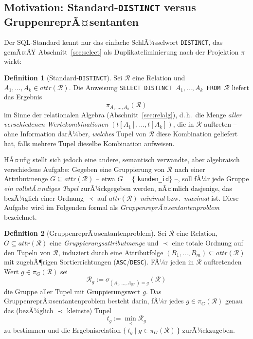 ﻿\documentclass[a4paper,12pt]{report}
\theoremstyle{definition}
\newtheorem{definition}{Definition}[chapter]
\theoremstyle{remark}
\newcommand{\R}{\mathcal{R}}
\newcommand{\att}{\mathit{attr}}
\begin{document}
\subsection{Motivation: Standard-\texttt{DISTINCT} versus GruppenreprÃ¤sentanten}

Der SQL-Standard kennt nur das einfache SchlÃ¼sselwort
\texttt{DISTINCT}, das gemÃ¤ÃŸ Abschnitt~\ref{sec:select} als
Duplikateliminierung nach der Projektion $\pi$ wirkt:

\begin{definition}[Standard-\texttt{DISTINCT}]
\label{def:distinct-standard}
Sei $\R$ eine Relation und $A_1,\ldots,A_k\in\att(\R)$. Die Anweisung
\texttt{SELECT DISTINCT $A_1,\ldots,A_k$ FROM $\R$} liefert das
Ergebnis
\[
  \pi_{A_1,\ldots,A_k}(\R)
\]
im Sinne der relationalen Algebra (Abschnitt~\ref{sec:relalg}), d.\,h.\
die Menge \emph{aller verschiedenen Wertekombinationen}
$(t[A_1],\ldots,t[A_k])$, die in $\R$ auftreten -- ohne Information
darÃ¼ber, \emph{welches} Tupel von $\R$ diese Kombination geliefert
hat, falls mehrere Tupel dieselbe Kombination aufweisen.
\end{definition}

HÃ¤ufig stellt sich jedoch eine andere, semantisch verwandte, aber
algebraisch verschiedene Aufgabe: Gegeben eine Gruppierung von $\R$
nach einer Attributmenge $G\subseteq\att(\R)$ -- etwa $G=\{$
\texttt{kunden\_id}$\}$ --, soll fÃ¼r jede Gruppe \emph{ein vollstÃ¤ndiges
Tupel} zurÃ¼ckgegeben werden, nÃ¤mlich dasjenige, das bezÃ¼glich einer
Ordnung $\prec$ auf $\att(\R)$ \emph{minimal} bzw.\ \emph{maximal}
ist. Diese Aufgabe wird im Folgenden formal als
\emph{GruppenreprÃ¤sentantenproblem} bezeichnet.

\begin{definition}[GruppenreprÃ¤sentantenproblem]
\label{def:gruppenrepraesentant}
Sei $\R$ eine Relation, $G\subseteq\att(\R)$ eine
\emph{Gruppierungsattributmenge} und $\prec$ eine totale
Ordnung auf den Tupeln von $\R$, induziert durch eine
Attributfolge $(B_1,\ldots,B_m)\subseteq\att(\R)$ mit zugehÃ¶rigen
Sortierrichtungen (\texttt{ASC}/\texttt{DESC}). FÃ¼r jeden in $\R$
auftretenden Wert $g\in\pi_G(\R)$ sei
\[
  \R_g := \sigma_{(A_1,\ldots,A_{|G|})=g}(\R)
\]
die Gruppe aller Tupel mit Gruppierungswert $g$. Das
GruppenreprÃ¤sentantenproblem besteht darin, fÃ¼r jedes $g\in\pi_G(\R)$
genau das (bezÃ¼glich $\prec$ kleinste) Tupel
\[
  t_g := \min_{\prec} \R_g
\]
zu bestimmen und die Ergebnisrelation
$\{\,t_g \mid g\in\pi_G(\R)\,\}$ zurÃ¼ckzugeben.
\end{definition}
\end{document}
